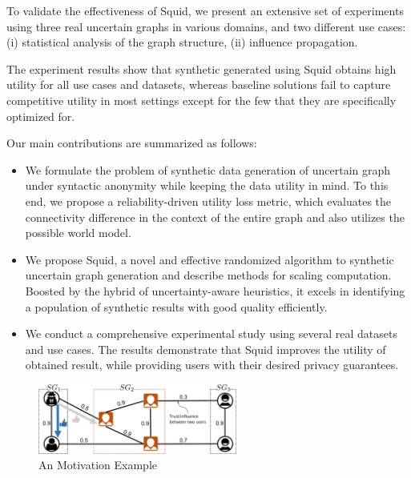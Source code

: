 To validate the effectiveness of Squid, we present an extensive
set of experiments using three real uncertain graphs in various
domains, and two different use cases: (i) statistical analysis of the
 graph structure, (ii) influence propagation. 
 
The experiment results show that synthetic
 generated using Squid obtains high utility for all
use cases and datasets, whereas baseline solutions fail to capture
competitive utility in most settings except for the few that they are
specifically optimized for. 

Our main contributions are summarized as follows: 
\begin{itemize}
\item We formulate the problem of synthetic data generation of uncertain graph under syntactic anonymity while keeping the data utility in mind. To this end, we propose a reliability-driven utility loss metric, which evaluates the connectivity difference in the context of the entire graph and also utilizes the possible world model.  

\item We propose Squid, a novel and effective randomized algorithm to synthetic uncertain graph generation and describe methods for scaling computation. Boosted by the hybrid of uncertainty-aware heuristics, it excels in identifying a population of synthetic results with good quality efficiently. 

\item We conduct a comprehensive experimental study using several
real datasets and use cases. The results demonstrate that
Squid improves the utility of
obtained result, while providing users with their desired privacy guarantees. 
\end{itemize}

\begin{figure}
    \centering
    \includegraphics[height=2.3cm] {figure/motivationExampleWideWithApplication.pdf}
    \caption{ An Motivation Example}
    \vspace{-10pt}
    \label{fig:motivationExample}
\end{figure}

